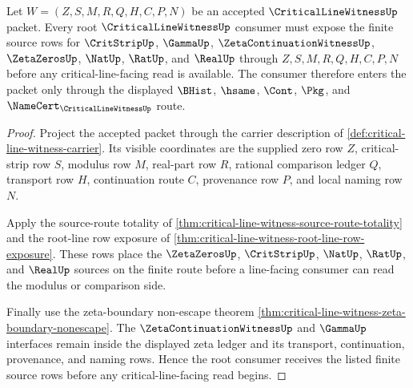 \begin{theorem}
\label{thm:critical-line-witness-root-strip-source-totality}
Let $W=(Z,S,M,R,Q,H,C,P,N)$ be an accepted $\CriticalLineWitnessUp$ packet.
Every root $\CriticalLineWitnessUp$ consumer must expose the finite source rows
for $\CritStripUp$, $\GammaUp$, $\ZetaContinuationWitnessUp$,
$\ZetaZerosUp$, $\NatUp$, $\RatUp$, and $\RealUp$ through
$Z,S,M,R,Q,H,C,P,N$ before any critical-line-facing read is available. The
consumer therefore enters the packet only through the displayed
$\BHist$, $\hsame$, $\Cont$, $\Pkg$, and
$\NameCert_{\CriticalLineWitnessUp}$ route.
\end{theorem}
\begin{proof}
Project the accepted packet through the carrier description of
\autoref{def:critical-line-witness-carrier}. Its visible coordinates are the
supplied zero row $Z$, critical-strip row $S$, modulus row $M$, real-part row
$R$, rational comparison ledger $Q$, transport row $H$, continuation route
$C$, provenance row $P$, and local naming row $N$.

Apply the source-route totality of
\autoref{thm:critical-line-witness-source-route-totality} and the root-line
row exposure of \autoref{thm:critical-line-witness-root-line-row-exposure}.
These rows place the $\ZetaZerosUp$, $\CritStripUp$, $\NatUp$, $\RatUp$, and
$\RealUp$ sources on the finite route before a line-facing consumer can read
the modulus or comparison side.

Finally use the zeta-boundary non-escape theorem
\autoref{thm:critical-line-witness-zeta-boundary-nonescape}. The
$\ZetaContinuationWitnessUp$ and $\GammaUp$ interfaces remain inside the
displayed zeta ledger and its transport, continuation, provenance, and naming
rows. Hence the root consumer receives the listed finite source rows before
any critical-line-facing read begins.
\end{proof}


